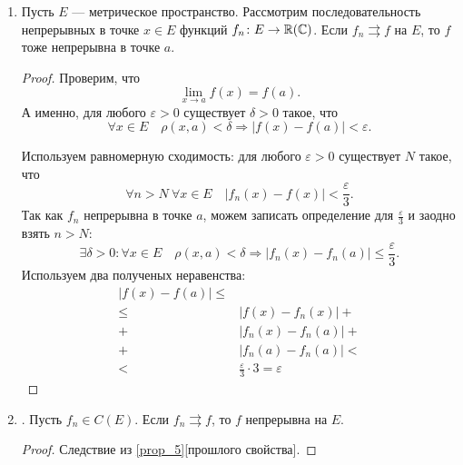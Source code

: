 \begin{prop}
\begin{enumerate}
\begin{proof}
\begin{description}
						Устремим $ m \to  \infty$. Тогда \[
							\lvert f_n(x) - f(x) \rvert \le  \varepsilon
						.\]
						По определению равномерной сходимости получаем, что $ f_n \rightrightarrows f$ на $ E$.
				\end{description}
			\end{proof}
		\item \label{prop_5} Пусть $ E$ --- метрическое пространство. Рассмотрим последовательность непрерывных в точке $ x \in E$ функций $ f_n \colon E \to \mathbb{R}(\mathbb{C}) $. Если $ f_n \rightrightarrows f$ на $ E$, то  $ f$ тоже непрерывна в точке  $ a$.
			\begin{proof}
				Проверим, что
				\[
					\lim_{x \to  a} f(x) = f(a)
				.\]
				А именно, для любого $ \varepsilon  > 0$ существует $ \delta > 0$ такое, что
				\[
					\forall x \in E \quad \rho(x, a) < \delta \Longrightarrow \lvert f(x) - f(a) \rvert  < \varepsilon
				.\]

				Используем равномерную сходимость: для любого  $ \varepsilon > 0$ существует $ N$ такое, что
				\[\label{eq:koshi_1}
					\forall n > N ~ \forall x \in E \quad \lvert f_n(x) - f(x) \rvert  < \frac{\varepsilon}{3}
				.\]
				Так как $ f_n$ непрерывна в точке $ a$, можем записать определение для  $ \frac{\varepsilon}{3}$ и заодно взять $ n > N$:
				\[
					\exists \delta >0 \colon \forall x \in  E \quad \rho(x, a) < \delta \Longrightarrow \lvert f_n(x) - f_n(a) \rvert \le \frac{\varepsilon}{3}
				.\]
				Используем два полученых неравенства:
				\begin{align*}
					\lvert f(x) - f(a) \rvert \le  & \\
					\le  & \lvert f(x) - f_n(x) \rvert + \\
					+ & \lvert f_n(x) - f_n(a) \rvert + \\
					+ & \lvert f_n(a) - f_n(a) \rvert < \\
					< & \frac{\varepsilon}{3} \cdot  3 = \varepsilon
				\end{align*}
			\end{proof}

		\item {}. Пусть $ f_n \in C(E)$. Если $ f_n \rightrightarrows f$, то $ f$ непрерывна на $ E$.
			\begin{proof}
				Следствие из \ref{prop_5}[прошлого свойства].
			\end{proof}
	\end{enumerate}
\end{prop}

